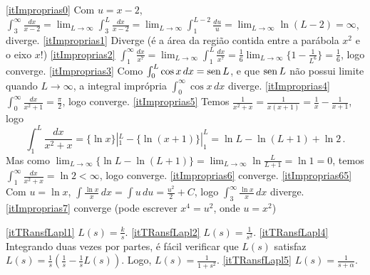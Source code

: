 \begin{Solution}{11.1}
\eqref{itImproprias0} Com $u=x-2$,
$\int_3^\infty\frac{dx}{x-2}=\lim_{L\to \infty}\int_3^L\frac{dx}{x-2}=
\lim_{L\to \infty}\int_1^{L-2}\frac{du}{u}=\lim_{L\to \infty}\ln(L-2)=\infty
$, diverge.
\eqref{itImproprias1} Diverge (é a área da região contida entre a parábola
$x^2$ e o eixo $x$!)
\eqref{itImproprias2} $\int_{1}^\infty
\tfrac{dx}{x^7}=\lim_{L\to\infty}\int_{1}^L \tfrac{dx}{x^7}=
\tfrac16\lim_{L\to\infty}\{1-\frac{1}{L^6}\}=\tfrac16$, logo converge.
\eqref{itImproprias3} Como $\int_0^L\cos x\,dx=\operatorname{sen} L$, e que $\operatorname{sen} L$ não
possui limite quando $L\to \infty$, a integral imprópria $\int_0^\infty\cos
x\,dx$ diverge.
\eqref{itImproprias4} $\int_{0}^\infty \frac{dx}{x^2+1}=\frac{\pi}{2}$, logo
converge.
\eqref{itImproprias5} Temos
$\frac{1}{x^2+x}=\frac{1}{x(x+1)}=\frac{1}{x}-\frac{1}{x+1}$, logo
$$\int_1^L\frac{dx}{x^2+x}=\{\ln x\}|_1^L-\{\ln(x+1)\}|_1^L
=\ln L-\ln(L+1)+\ln 2\,.
$$
Mas como $\lim_{L\to \infty}\{\ln L-\ln(L+1)\}=
\lim_{L\to \infty}\ln\frac{L}{L+1}=\ln 1=0$, temos
$\int_{1}^\infty \frac{dx}{x^2+x}=\ln 2<\infty$, logo converge.
\eqref{itImproprias6} converge.
\eqref{itImproprias65} Com $u=\ln x$, $\int\frac{\ln x}{x}\,dx=\int
u\,du=\frac{u^2}{2}+C$, logo $\int_{3}^\infty \frac{\ln x}{x}\,dx$ diverge.
\eqref{itImproprias7} converge (pode escrever $x^4=u^2$, onde $u=x^2$)
\end{Solution}
\begin{Solution}{11.2}
\eqref{itTRansfLapl1} $L(s)=\frac{k}{s}$.
\eqref{itTRansfLapl2} $L(s)=\frac{1}{s^2}$.
\eqref{itTRansfLapl4} Integrando duas vezes por partes, é fácil
verificar que $L(s)$ satisfaz $L(s)=\frac{1}{s}(\frac{1}{s}-\frac{1}{s}L(s))$.
Logo, $L(s)=\frac{1}{1+s^2}$.
\eqref{itTRansfLapl5} $L(s)=\frac{1}{s+\alpha}$.
\end{Solution}
